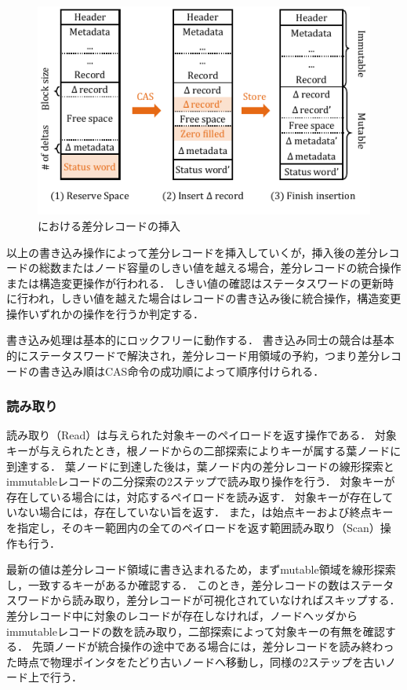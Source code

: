 \begin{figure}[t]
    \centering
    \includegraphics{./figures/Bc-insertion.pdf}
    \caption{\Bctree{}における差分レコードの挿入}
    \label{fig:bc_tree_insertion}
\end{figure}

以上の書き込み操作によって差分レコードを挿入していくが，挿入後の差分レコードの総数またはノード容量のしきい値を越える場合，差分レコードの統合操作または構造変更操作が行われる．
しきい値の確認はステータスワードの更新時に行われ，しきい値を越えた場合はレコードの書き込み後に統合操作，構造変更操作いずれかの操作を行うか判定する．

書き込み処理は基本的にロックフリーに動作する．
書き込み同士の競合は基本的にステータスワードで解決され，差分レコード用領域の予約，つまり差分レコードの書き込み順はCAS命令の成功順によって順序付けられる．

\subsubsection{読み取り}

読み取り（Read）は与えられた対象キーのペイロードを返す操作である．
対象キーが与えられたとき，根ノードからの二部探索によりキーが属する葉ノードに到達する．
葉ノードに到達した後は，葉ノード内の差分レコードの線形探索とimmutableレコードの二分探索の2ステップで読み取り操作を行う．
対象キーが存在している場合には，対応するペイロードを読み返す．
対象キーが存在していない場合には，存在していない旨を返す．
また，\Bctree{}は始点キーおよび終点キーを指定し，そのキー範囲内の全てのペイロードを返す範囲読み取り（Scan）操作も行う．

最新の値は差分レコード領域に書き込まれるため，まずmutable領域を線形探索し，一致するキーがあるか確認する．
このとき，差分レコードの数はステータスワードから読み取り，差分レコードが可視化されていなければスキップする．
差分レコード中に対象のレコードが存在しなければ，ノードヘッダからimmutableレコードの数を読み取り，二部探索によって対象キーの有無を確認する．
先頭ノードが統合操作の途中である場合には，差分レコードを読み終わった時点で物理ポインタをたどり古いノードへ移動し，同様の2ステップを古いノード上で行う．

